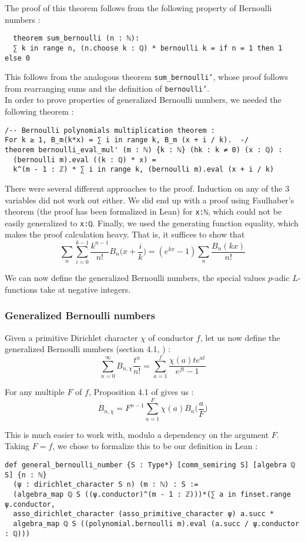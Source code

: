 \documentclass[11pt]{article}
\newcommand{\lean}[1]{\texttt{#1}\xspace} %
\begin{document}
The proof of this theorem follows from the following property of Bernoulli numbers :

\begin{lstlisting}
  theorem sum_bernoulli (n : ℕ):
  ∑ k in range n, (n.choose k : ℚ) * bernoulli k = if n = 1 then 1 else 0
\end{lstlisting}

This follows from the analogous theorem \lean{sum\_bernoulli'}, whose proof follows from rearranging
sums and the definition of \lean{bernoulli'}. \\

In order to prove properties of generalized Bernoulli numbers, we needed the following theorem :
\begin{lstlisting}
/-- Bernoulli polynomials multiplication theorem :
For k ≥ 1, B_m(k*x) = ∑ i in range k, B_m (x + i / k).  -/
theorem bernoulli_eval_mul' (m : ℕ) {k : ℕ} (hk : k ≠ 0) (x : ℚ) :
  (bernoulli m).eval ((k : ℚ) * x) = 
  k^(m - 1 : ℤ) * ∑ i in range k, (bernoulli m).eval (x + i / k) 
\end{lstlisting}

There were several different approaches to the proof. Induction on any of the 3 variables did not work 
out either. We did end up with a proof using Faulhaber's theorem (the proof has been formalized in Lean) 
for \lean{x:ℕ}, which could not be easily generalized to \lean{x:ℚ}. Finally, we used the generating function 
equality, which makes the proof calculation heavy. That is, it suffices to show that 
$$ \sum_n \sum_{i = 0}^{k - 1} \frac{k^{n - 1}}{n!} B_n \bigg(x + \frac{i}{k} \bigg) = (e^{kx} - 1) \sum_n \frac{B_n (kx)}{n!} $$

We can now define the generalized Bernoulli numbers, the special values $p$-adic $L$-functions take at negative integers.

\subsubsection{Generalized Bernoulli numbers}
Given a primitive Dirichlet character $\chi$ of conductor $f$, let us now define the generalized
Bernoulli numbers (section 4.1, \cite{cyc}) :
$$ \sum_{n = 0}^{\infty} B_{n,\chi} \frac{t^n}{n!} = \sum_{a = 1}^f \frac{\chi(a)t e^{at}}{e^{ft} - 1} $$

For any multiple $F$ of $f$, Proposition 4.1 of \cite{cyc} gives us : 
$$ B_{n, \chi} = F^{n - 1} \sum_{a = 1}^{F} \chi (a) B_n \bigg( \frac{a}{F} \bigg) $$

This is much easier to work with, modulo a dependency on the argument $F$. Taking $F = f$, we chose to formalize this 
to be our definition in Lean :
\begin{lstlisting}
def general_bernoulli_number {S : Type*} [comm_semiring S] [algebra ℚ S] {n : ℕ} 
  (ψ : dirichlet_character S n) (m : ℕ) : S :=
  (algebra_map ℚ S ((ψ.conductor)^(m - 1 : ℤ)))*(∑ a in finset.range ψ.conductor,
  asso_dirichlet_character (asso_primitive_character ψ) a.succ * 
  algebra_map ℚ S ((polynomial.bernoulli m).eval (a.succ / ψ.conductor : ℚ)))
\end{lstlisting}
\end{document}
